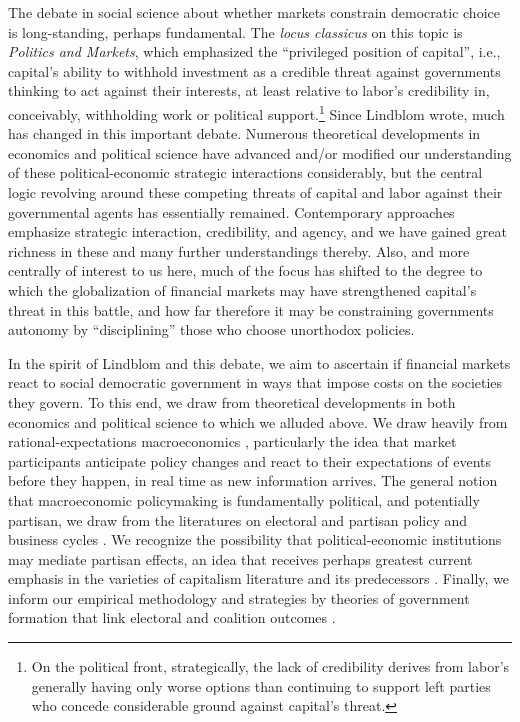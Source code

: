 \documentclass[12pt]{article}
\begin{document}
The debate in social science about whether markets constrain democratic choice is long-standing, perhaps fundamental. The \textit{locus classicus} on this topic is \citet{Lindblom1977} \textit{Politics and Markets}, which emphasized the ``privileged position of capital'', i.e., capital's ability to withhold investment as a credible threat against governments thinking to act against their interests, at least relative to labor's credibility in, conceivably, withholding work or political support.\footnote{On the political front, strategically, the lack of credibility derives from labor's generally having only worse options than continuing to support left parties who concede considerable ground against capital's threat.}  Since Lindblom wrote, much has changed in this important debate. Numerous theoretical developments in economics and political science have advanced and/or modified our understanding of these political-economic strategic interactions considerably, but the central logic revolving around these competing threats of capital and labor against their governmental agents has essentially remained. Contemporary approaches emphasize strategic interaction, credibility, and agency, and we have gained great richness in these and many further understandings thereby. Also, and more centrally of interest to us here, much of the focus has shifted to the degree to which the globalization of financial markets may have strengthened capital's threat in this battle, and how far therefore it may be constraining governments autonomy by ``disciplining'' those who choose unorthodox policies. 

In the spirit of Lindblom and this debate, we aim to ascertain if financial markets react to social democratic government in ways that impose costs on the societies they govern. To this end, we draw from theoretical developments in both economics and political science to which we alluded above. We draw heavily from rational-expectations macroeconomics \citep{Fama1970, Lucas1987}, particularly the idea that market participants anticipate policy changes and react to their expectations of events before they happen, in real time as new information arrives. The general notion that macroeconomic policymaking is fundamentally political, and potentially partisan, we draw from the literatures on electoral \citep{Tufte1978, Nordhaus1975} and partisan policy and business cycles \citep{Hibbs1987, Alesina1989}. We recognize the possibility that political-economic institutions may mediate partisan effects, an idea that receives perhaps greatest current emphasis in the varieties of capitalism literature and its predecessors \citep{Garrett1998, Kitschelt1999, Hall2001}. Finally, we inform our empirical methodology and strategies by theories of government formation that link electoral and coalition outcomes \citep{Laver1996, Tsebelis1999}.
\end{document}
